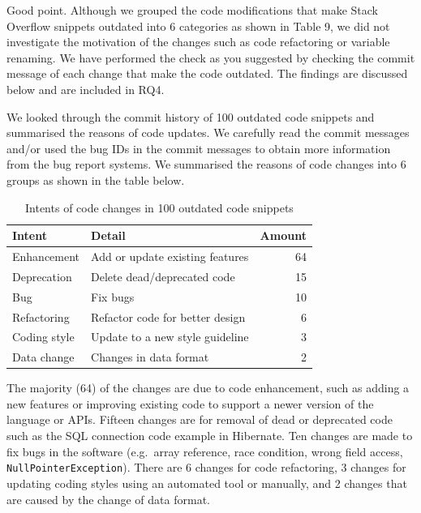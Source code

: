 \documentclass[a4paper,twoside,10pt]{reviewresponse}
\begin{document}
		

Good point. Although we grouped the code modifications that make Stack Overflow
snippets outdated into 6 categories as shown in Table 9, we did not investigate
the motivation of the changes such as code refactoring or variable renaming. We
have performed the check as you suggested by checking the commit message of each
change that make the code outdated. The findings are discussed below and are
included in RQ4.

We looked through the commit history of 100 outdated code snippets and
summarised the reasons of code updates. We carefully read the commit messages
and/or used the bug IDs in the commit messages to obtain more information from
the bug report systems. We summarised the reasons of code changes into 6 groups
as shown in the table below.

\begin{table}[H]
	\centering
	\begin{tabular}{llr}
		\toprule
		Intent & Detail & Amount \\
		\midrule
		Enhancement & Add or update existing features & 64 \\
		Deprecation & Delete dead/deprecated code & 15 \\
		Bug & Fix bugs & 10 \\
		Refactoring & Refactor code for better design & 6 \\
		Coding style & Update to a new style guideline & 3 \\
		Data change & Changes in data format & 2 \\
		\bottomrule
	\end{tabular}
	\label{tab:intent_outdated}
	\caption{Intents of code changes in 100 outdated code snippets}
\end{table}

The majority (64) of the changes are due to code enhancement, such as adding a
new features or improving existing code to support a newer version of the
language or APIs. Fifteen changes are for removal of dead or deprecated code
such as the SQL connection code example in Hibernate. Ten changes are made to
fix bugs in the software (e.g.~array reference, race condition, wrong field
access, \texttt{NullPointerException}). There are 6 changes for code
refactoring, 3 changes for updating coding styles using an automated tool or
manually, and 2 changes that are caused by the change of data format.
\end{document}
